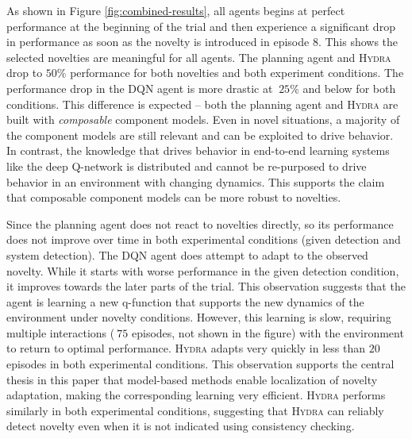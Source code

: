 \documentclass[sigconf]{aamas}
\newcommand{\hydra}{\textsc{Hydra}\xspace} %
\begin{document}
As shown in Figure \ref{fig:combined-results}, all agents begins at perfect performance at the beginning of the trial and then experience a significant drop in performance as soon as the novelty is introduced in episode $8$. 
This shows the selected novelties are meaningful for all agents. 
The planning agent and \hydra drop to $50\%$ performance for both novelties and both experiment conditions. 
The performance drop in the DQN agent is more drastic at $~25\%$ and below for both conditions. 
This difference is expected -- both the planning agent and \hydra are built with \emph{composable} component models. 
Even in novel situations, a majority of the component models are still relevant and can be exploited to drive behavior. 
In contrast, the knowledge that drives behavior in end-to-end learning systems like the deep Q-network is distributed and cannot be re-purposed to drive behavior in an environment with changing dynamics. 
This supports the claim that composable component models can be more robust to novelties.  


Since the planning agent does not react to novelties directly, so its performance does not improve over time in both experimental conditions (given detection and system detection). 
The DQN agent does attempt to adapt to the observed novelty. 
While it starts with worse performance in the given detection condition, it improves towards the later parts of the trial. 
This observation suggests that the agent is learning a new q-function that supports the new dynamics of the environment under novelty conditions. 
However, this learning is slow, requiring multiple interactions ($~75$ episodes, not shown in the figure) with the environment to return to optimal performance. 
\hydra adapts very quickly in less than $20$ episodes in both experimental conditions. 
This observation supports the central thesis in this paper that model-based methods enable localization of novelty adaptation, making the corresponding learning very efficient. 
\hydra performs similarly in both experimental conditions, suggesting that \hydra can reliably detect novelty even when it is not indicated using consistency checking. 
\end{document}

